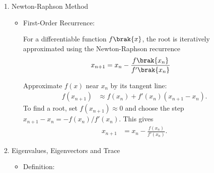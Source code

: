 \begin{enumerate}[label=\thesubsection.\arabic*, ref=\thesubsection.\theenumi,itemsep=0pt]
\begin{itemize}
\solution
For a continuous random variable, the probability of values in an interval is obtained by integrating its density. The expectation is the probability-weighted average of $g(x)$, so
\begin{align}
\mathbb{E}[g(X)]
&=\int_{-\infty}^{\infty}g(x)f_X(x)\,dx.
\end{align}
Taking $g(x)=x$ gives the expectation of $X$:
\begin{align}
\mathbb{E}[X]
&=\int_{-\infty}^{\infty}xf_X(x)\,dx.
\end{align}
\item Discrete Random Variable:
\begin{align}
\mathbb{E}[g\brak{X}]
&= \sum_x g\brak{x}\Pr\brak{X=x}
\label{eq:expectation_discrete}
\end{align}

\solution
For a discrete random variable, each possible value $x$ occurs with probability $\Pr(X=x)$. Summing the value of $g(x)$ weighted by these probabilities gives
\begin{align}
\mathbb{E}[g(X)]
&=\sum_x g(x)\Pr(X=x).
\end{align}
\end{itemize}

\item Newton-Raphson Method
\begin{itemize}
\item First-Order Recurrence:

For a differentiable function $f\brak{x}$, the root is iteratively approximated using the Newton-Raphson recurrence
\begin{align}
x_{n+1}
&= x_n-\frac{f\brak{x_n}}{f'\brak{x_n}}
\label{eq:newton_raphson}
\end{align}

\solution
Approximate $f(x)$ near $x_n$ by its tangent line:
\begin{align}
f(x_{n+1})&\approx f(x_n)+f'(x_n)(x_{n+1}-x_n).
\end{align}
To find a root, set $f(x_{n+1})\approx 0$ and choose the step $x_{n+1}-x_n=-f(x_n)/f'(x_n)$. This gives
\begin{align}
x_{n+1}&=x_n-\frac{f(x_n)}{f'(x_n)}.
\end{align}
\end{itemize}

\item Eigenvalues, Eigenvectors and Trace
\begin{itemize}
\item Definition:


\end{itemize}
\end{enumerate}

